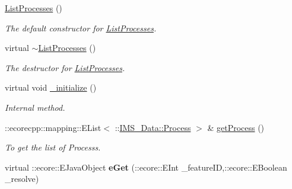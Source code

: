 \begin{DoxyCompactItemize}
\item 
\hypertarget{classIMS__Data_1_1ListProcesses_a29d0bb03148a882011a8e878da75a90e}{
\hyperlink{classIMS__Data_1_1ListProcesses_a29d0bb03148a882011a8e878da75a90e}{ListProcesses} ()}
\label{classIMS__Data_1_1ListProcesses_a29d0bb03148a882011a8e878da75a90e}

\begin{DoxyCompactList}\small\item\em The default constructor for \hyperlink{classIMS__Data_1_1ListProcesses}{ListProcesses}. \item\end{DoxyCompactList}\item 
\hypertarget{classIMS__Data_1_1ListProcesses_aa8ed671b054a06f071a025df81ee9dfc}{
virtual \hyperlink{classIMS__Data_1_1ListProcesses_aa8ed671b054a06f071a025df81ee9dfc}{$\sim$ListProcesses} ()}
\label{classIMS__Data_1_1ListProcesses_aa8ed671b054a06f071a025df81ee9dfc}

\begin{DoxyCompactList}\small\item\em The destructor for \hyperlink{classIMS__Data_1_1ListProcesses}{ListProcesses}. \item\end{DoxyCompactList}\item 
\hypertarget{classIMS__Data_1_1ListProcesses_a5790d1a994073eda71becca7e9d50ce2}{
virtual void \hyperlink{classIMS__Data_1_1ListProcesses_a5790d1a994073eda71becca7e9d50ce2}{\_\-initialize} ()}
\label{classIMS__Data_1_1ListProcesses_a5790d1a994073eda71becca7e9d50ce2}

\begin{DoxyCompactList}\small\item\em Internal method. \item\end{DoxyCompactList}\item 
::ecorecpp::mapping::EList$<$ ::\hyperlink{classIMS__Data_1_1Process}{IMS\_\-Data::Process} $>$ \& \hyperlink{classIMS__Data_1_1ListProcesses_ae07c439042d88ab2482498dd15b906af}{getProcess} ()
\begin{DoxyCompactList}\small\item\em To get the list of Processs. \item\end{DoxyCompactList}\item 
\hypertarget{classIMS__Data_1_1ListProcesses_ab62084ce5500a42a377dc42861c8892c}{
virtual ::ecore::EJavaObject {\bfseries eGet} (::ecore::EInt \_\-featureID,::ecore::EBoolean \_\-resolve)}
\label{classIMS__Data_1_1ListProcesses_ab62084ce5500a42a377dc42861c8892c}


\end{DoxyCompactItemize}
